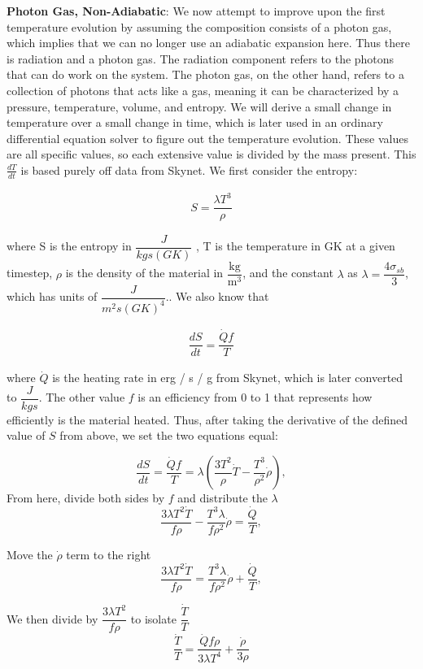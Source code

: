 \documentclass[11pt,a4paper]{article}
\begin{document}
\textbf{Photon Gas, Non-Adiabatic}: We now attempt to improve upon the first temperature evolution by assuming the composition consists of a photon gas, which implies that we can no longer use an adiabatic expansion here. Thus there is radiation and a photon gas. The radiation component refers to the photons that can do work on the system. The photon gas, on the other hand, refers to a collection of photons that acts like a gas, meaning it can be characterized by a pressure, temperature, volume, and entropy. We will derive a small change in temperature over a small change in time, which is later used in an ordinary differential equation solver to figure out the temperature evolution. These values are all specific values, so each extensive value is divided by the mass present. This $\frac{dT}{dt}$ is based purely off data from Skynet. We first consider the entropy:

\begin{align}
	S = \dfrac{\lambda T^3}{\rho}
\end{align}

where S is the entropy in $\dfrac{J}{kg s (GK)}$ , T is the temperature in GK at a given timestep, $\rho$ is the density of the material in $\mathrm{\dfrac{kg}{m^3}}$, and the constant $\lambda$ as $\lambda =  \dfrac{4 \sigma_{sb}}{3}$, which has units of $\dfrac{J}{m^2 s ({GK})^4}$.. We also know that 

\begin{align}
	\dfrac{dS}{dt} = \dfrac{\dot{Q} f}{T}
\end{align}

where $\dot{Q}$ is the heating rate in erg / s / g from Skynet, which is later converted to $\dfrac{J}{kg s}$. The other value $f$ is an efficiency from 0 to 1 that represents how efficiently is the material heated. Thus, after taking the derivative of the defined value of $S$ from above, we set the two equations equal: 

$$ \dfrac{dS}{dt} = \dfrac{\dot{Q} f}{T} = \lambda \left(\dfrac{3T^2}{\rho}\dot{T} - \dfrac{T^3}{\rho^2}\dot{\rho} \right),$$ From here, divide both sides by $f$ and distribute the $\lambda$
$$ \dfrac{3 \lambda T^2 \dot{T}}{f \rho} - \dfrac{T^3 \lambda}{f \rho^2}\dot{\rho} = \dfrac{\dot{Q}}{T}, $$

Move the $\dot{\rho}$ term to the right 
$$ \dfrac{3 \lambda T^2 \dot{T}}{f \rho} = \dfrac{T^3 \lambda}{f \rho^2}\dot{\rho} + \dfrac{\dot{Q}}{T}, $$

We then divide by $\dfrac{3 \lambda T^2}{f \rho} $ to isolate $\dfrac{\dot{T}}{T}$
$$ \dfrac{\dot{T}}{T} = \dfrac{\dot{Q} f \rho}{3 \lambda T^4} + \dfrac{\dot{\rho}}{3 \rho} $$ 
\end{document}
